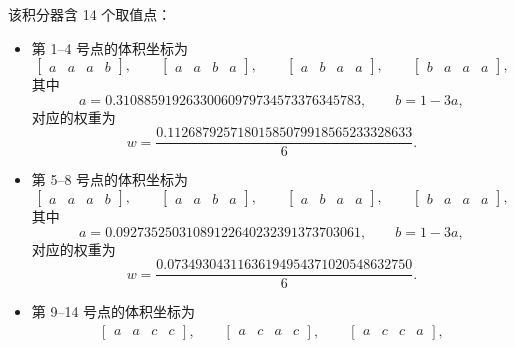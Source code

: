该积分器含 14 个取值点：
\begin{itemize}[wide]
\item 第 1–4 号点的体积坐标为
\begin{equation}
\begin{bmatrix}a & a & a & b\end{bmatrix},\qquad\begin{bmatrix}a & a & b & a\end{bmatrix},\qquad\begin{bmatrix}a & b & a & a\end{bmatrix},\qquad\begin{bmatrix}b & a & a & a\end{bmatrix},
\end{equation}
其中
\begin{equation}
a=0.31088591926330060979734573376345783,\qquad b=1-3a,
\end{equation}
对应的权重为
\begin{equation}
w=\frac{0.11268792571801585079918565233328633}{6}.
\end{equation}
\item 第 5–8 号点的体积坐标为
\begin{equation}
\begin{bmatrix}a & a & a & b\end{bmatrix},\qquad\begin{bmatrix}a & a & b & a\end{bmatrix},\qquad\begin{bmatrix}a & b & a & a\end{bmatrix},\qquad\begin{bmatrix}b & a & a & a\end{bmatrix},
\end{equation}
其中
\begin{equation}
a=0.09273525031089122640232391373703061,\qquad b=1-3a,
\end{equation}
对应的权重为
\begin{equation}
w=\frac{0.07349304311636194954371020548632750}{6}.
\end{equation}
\item 第 9–14 号点的体积坐标为
\begin{equation}
\begin{gathered}\begin{bmatrix}a & a & c & c\end{bmatrix},\qquad\begin{bmatrix}a & c & a & c\end{bmatrix},\qquad\begin{bmatrix}a & c & c & a\end{bmatrix},\\

\end{gathered}
\end{equation}
\end{itemize}
